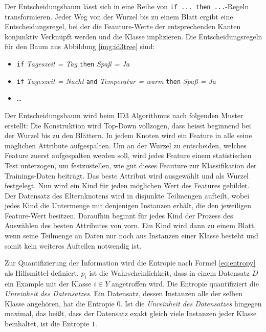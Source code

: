 Der Entscheidungsbaum lässt sich in eine Reihe von \texttt{if ... then ...}-Regeln transformieren. Jeder Weg von der Wurzel bis zu einem Blatt ergibt eine Entscheidungsregel, bei der die Feauture-Werte der entsprechenden Kanten konjunktiv Verknüpft werden und die Klasse implizieren. Die Entscheidungsregeln für den Baum aus Abbildung 	\ref{img:id3tree} sind: \cite[S. 134]{machine_marsland}

\begin{itemize}
	\item \texttt{if}  \emph{Tageszeit = Tag} \texttt{then} \emph{Spaß = Ja}
	\item \texttt{if}  \emph{Tageszeit = Nacht} \texttt{and} \emph{Temperatur = warm} \texttt{then} \emph{Spaß = Ja}
	\item \ldots
\end{itemize}

Der Entscheidungsbaum wird beim ID3 Algorithmus nach folgenden Muster erstellt: Die Konstruktion wird Top-Down vollzogen, dass heisst beginnend bei der Wurzel bis zu den Blättern. In jedem Knoten wird ein Feature in alle seine möglichen Attribute aufgespalten. Um an der Wurzel zu entscheiden, welches Feature zuerst aufgespalten werden soll, wird jedes Feature einem statistischen Test unterzogen, um festzustellen, wie \glqq gut\grqq{} dieses Feauture zur Klassifikation der Trainings-Daten beiträgt. Das \glqq beste\grqq{} Attribut wird ausgewählt und als Wurzel festgelegt. Nun wird ein Kind für jeden möglichen Wert des Features gebildet. Der Datensatz des Elternknotens wird in disjunkte Teilmengen aufteilt, wobei jedes Kind die Untermenge mit denjenigen Instanzen erhält, die den jeweiligen Feature-Wert besitzen. Daraufhin beginnt für jedes Kind der Prozess des Auswählen des \glqq besten\grqq{} Attributes von vorn. Ein Kind wird dann zu einem Blatt, wenn seine Teilmenge an Daten nur noch aus Instanzen einer Klasse besteht und somit kein weiteres Aufteilen notwendig ist.\cite[S. 55]{machine_mitchell}

Zur Quantifizierung der Information wird die Entropie nach Formel \ref{eq:entropy} als Hilfsmittel definiert. $p_i$ ist die Wahrscheinlichkeit, dass in einem Datensatz $D$ ein Example mit der Klasse $i \in Y$ angetroffen wird. Die Entropie quantifiziert die \emph{Unreinheit des Datensatzes}. Ein Datensatz, dessen Instanzen alle der selben Klasse angehören, hat die Entropie $0$. Ist die \emph{Unreinheit des Datensatzes} hingegen maximal, das heißt, dass der Datensatz exakt gleich viele Instanzen jeder Klasse beinhaltet, ist die Entropie $1$. \cite[S. 135]{machine_marsland}

